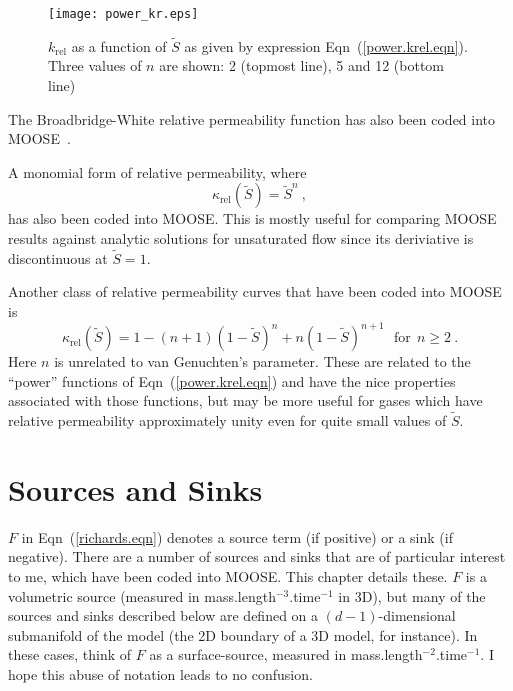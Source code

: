 \documentclass[]{scrreprt}
\begin{document}
\begin{figure}[htb]
\centering
\texttt{[image: power\_kr.eps]}
\caption{$k_{\mathrm{rel}}$ as a function of $\tilde{S}$
  as given by expression Eqn~(\ref{power.krel.eqn}).
Three values  of $n$ are shown: 2 (topmost line), 5 and 12 (bottom line)}
\label{power_krel.fig}
\end{figure}


The Broadbridge-White relative permeability function has also been
coded into MOOSE~\cite{bw1988}.

A monomial form of relative permeability, where
\begin{equation}
\kappa_{\mathrm{rel}}(\tilde{S}) = \tilde{S}^{n} \ ,
\label{monomial.krel.eqn}
\end{equation}
has also been coded into MOOSE.  This is mostly useful for comparing
MOOSE results against analytic solutions for unsaturated flow since
its deriviative is discontinuous at $\tilde{S}=1$.

Another class of relative permeability curves that have been coded into MOOSE is
\begin{equation}
\kappa_{\mathrm{rel}}(\tilde{S}) = 1 - (n+1)(1-\tilde{S})^{n} + n
(1-\tilde{S})^{n+1} \ \ \ \mbox{for}\ \ n\geq 2 \ .
\label{powergas.krel.eqn}
\end{equation}
Here $n$ is unrelated to van Genuchten's parameter.  These are related
to the ``power'' functions of Eqn~(\ref{power.krel.eqn}) and have the
nice properties associated with those functions, but may be more
useful for gases which have relative permeability approximately unity
even for quite small values of $\tilde{S}$.





\chapter{Sources and Sinks}
\label{sources.sinks.chap}

$F$ in Eqn~(\ref{richards.eqn}) denotes a source term (if positive) or
a sink (if negative).  There are a number of sources and sinks that
are of particular interest to me, which have been coded
into MOOSE.  This chapter details these.  $F$ is a volumetric source
(measured in mass.length$^{-3}$.time$^{-1}$ in 3D), but many of the sources
and sinks described below are defined on a $(d-1)$-dimensional
submanifold of the model (the 2D boundary of a 3D model, for
instance).  In these cases, think of $F$ as a surface-source, measured
in mass.length$^{-2}$.time$^{-1}$.  I hope this abuse of notation
leads to no confusion.
\end{document}

